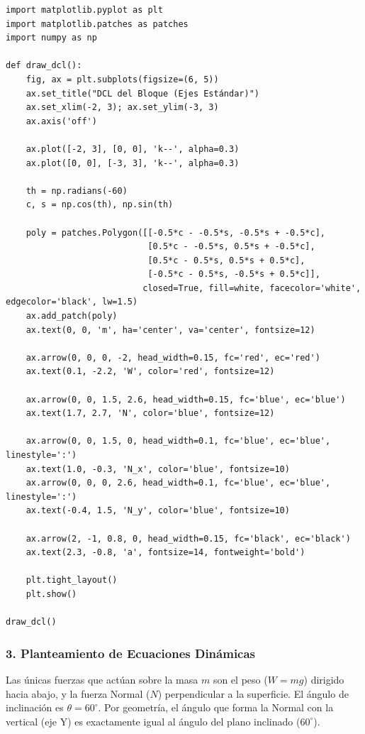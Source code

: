 \documentclass[12pt, a4paper]{article}
\begin{document}
\begin{lstlisting}
import matplotlib.pyplot as plt
import matplotlib.patches as patches
import numpy as np

def draw_dcl():
    fig, ax = plt.subplots(figsize=(6, 5))
    ax.set_title("DCL del Bloque (Ejes Estándar)")
    ax.set_xlim(-2, 3); ax.set_ylim(-3, 3)
    ax.axis('off')
    
    ax.plot([-2, 3], [0, 0], 'k--', alpha=0.3)
    ax.plot([0, 0], [-3, 3], 'k--', alpha=0.3)
    
    th = np.radians(-60)
    c, s = np.cos(th), np.sin(th)
    
    poly = patches.Polygon([[-0.5*c - -0.5*s, -0.5*s + -0.5*c], 
                            [0.5*c - -0.5*s, 0.5*s + -0.5*c], 
                            [0.5*c - 0.5*s, 0.5*s + 0.5*c], 
                            [-0.5*c - 0.5*s, -0.5*s + 0.5*c]], 
                           closed=True, fill=white, facecolor='white', edgecolor='black', lw=1.5)
    ax.add_patch(poly)
    ax.text(0, 0, 'm', ha='center', va='center', fontsize=12)
    
    ax.arrow(0, 0, 0, -2, head_width=0.15, fc='red', ec='red')
    ax.text(0.1, -2.2, 'W', color='red', fontsize=12)
    
    ax.arrow(0, 0, 1.5, 2.6, head_width=0.15, fc='blue', ec='blue')
    ax.text(1.7, 2.7, 'N', color='blue', fontsize=12)
    
    ax.arrow(0, 0, 1.5, 0, head_width=0.1, fc='blue', ec='blue', linestyle=':')
    ax.text(1.0, -0.3, 'N_x', color='blue', fontsize=10)
    ax.arrow(0, 0, 0, 2.6, head_width=0.1, fc='blue', ec='blue', linestyle=':')
    ax.text(-0.4, 1.5, 'N_y', color='blue', fontsize=10)
    
    ax.arrow(2, -1, 0.8, 0, head_width=0.15, fc='black', ec='black')
    ax.text(2.3, -0.8, 'a', fontsize=14, fontweight='bold')

    plt.tight_layout()
    plt.show()

draw_dcl()
\end{lstlisting}

\subsubsection*{3. Planteamiento de Ecuaciones Dinámicas}
Las únicas fuerzas que actúan sobre la masa $m$ son el peso ($W = mg$) dirigido hacia abajo, y la fuerza Normal ($N$) perpendicular a la superficie.
El ángulo de inclinación es $\theta = 60^\circ$. Por geometría, el ángulo que forma la Normal con la vertical (eje Y) es exactamente igual al ángulo del plano inclinado ($60^\circ$).
\end{document}
